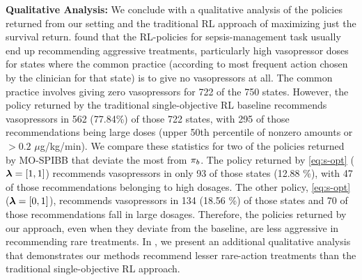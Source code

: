 \textbf{Qualitative Analysis:} 
We conclude with a qualitative analysis of the policies returned from our setting and the traditional RL approach of maximizing just the survival return. 
%
\citet{ji2020trajectory} found that the RL-policies for sepsis-management task usually end up recommending aggressive treatments, particularly high vasopressor doses for states where the common practice 
(according to most frequent action chosen by the clinician for that state) 
is to give no vasopressors at all. The common practice involves giving zero vasopressors for 722 of the 750 states. However, the policy returned by the traditional single-objective RL baseline recommends vasopressors in 562 (77.84\%) of those 722 states, with 295 of those recommendations being large doses
(upper 50th percentile of nonzero amounts  or $>0.2$ $\mu$g/kg/min). 
We compare these statistics for two of the policies returned by MO-SPIBB that deviate the most from $\pi_{b}$. 
The policy returned by \ref{eq:s-opt} ($\bm{\lambda}=[1,1]$) recommends vasopressors in only 93 of those states (12.88 \%), with 47 of those recommendations belonging to high dosages. The other policy, \ref{eq:s-opt} ($\bm{\lambda}=[0,1]$), recommends vasopressors in 134 (18.56 \%) of those states and 70 of those recommendations fall in large dosages.
Therefore, the policies returned by our approach, even when they deviate from the baseline, are less aggressive in recommending rare treatments. 
In , we present an additional qualitative analysis that demonstrates our methods recommend lesser rare-action treatments than the traditional single-objective RL approach.

